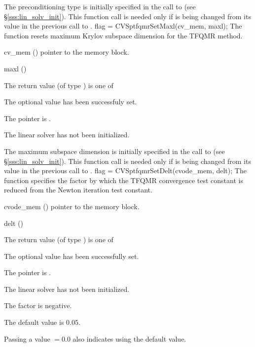 {
  The preconditioning type is initially specified in the call
  to  (see \S\ref{sss:lin_solv_init}). This function call is
  needed only if  is being changed from its value in the
  previous call to .
}
{
  flag = CVSptfqmrSetMaxl(cv\_mem, maxl);
}
{
  The function  resets maximum Krylov subspace
  dimension for the TFQMR method.
}
{
  \begin{args}[cv\_mem]
  \item[cv\_mem] ()
    pointer to the {\cvode} memory block.
  \item[maxl] ()

  \end{args}
}
{
  The return value  (of type ) is one of
  \begin{args}
  \item[\Id{CVSPTFQMR\_SUCCESS}] 
    The optional value has been successfuly set.
  \item[\Id{CVSPTFQMR\_MEM\_NULL}]
    The  pointer is .
  \item[\Id{CVSPTFQMR\_LMEM\_NULL}]
    The {\cvsptfqmr} linear solver has not been initialized.
  \end{args}
}
{
  The maximum subspace dimension is initially specified in the call
  to  (see \S\ref{sss:lin_solv_init}). This function call is
  needed only if  is being changed from its value in the
  previous call to .
}
{
  flag = CVSptfqmrSetDelt(cvode\_mem, delt);
}
{
  The function  specifies the factor by
  which the TFQMR convergence test constant is reduced
  from the Newton iteration test constant.
}
{
  \begin{args}
  \item[cvode\_mem] ()
    pointer to the {\cvode} memory block.
  \item[delt] ()

  \end{args}
}
{
  The return value  (of type ) is one of
  \begin{args}
  \item[\Id{CVSPTFQMR\_SUCCESS}] 
    The optional value has been successfully set.
  \item[\Id{CVSPTFQMR\_MEM\_NULL}]
    The  pointer is .
  \item[\Id{CVSPTFQMR\_LMEM\_NULL}]
    The {\cvsptfqmr} linear solver has not been initialized.
  \item[\Id{CVSPTFQMR\_ILL\_INPUT}]
    The factor  is negative.  
  \end{args}
}
{
  The default value is $0.05$.

  Passing a value $ = 0.0$ also indicates using the default value.
}

